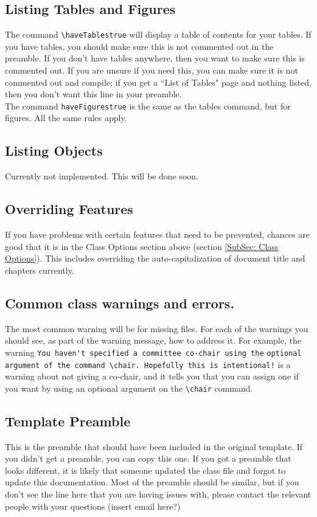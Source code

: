 \documentclass{article}
\begin{document}
    \subsection{Listing Tables and Figures}
        The command \verb|\haveTablestrue| will display a table of contents for your tables. If you have tables, you should make sure this is not commented out in the preamble. If you don't have tables anywhere, then you want to make sure this is commented out. If you are unsure if you need this, you can make sure it is not commented out and compile; if you get a ``List of Tables" page and nothing listed, then you don't want this line in your preamble.\\
        The command \verb|haveFigurestrue| is the same as the tables command, but for figures. All the same rules apply.
        
    \subsection{Listing Objects}
        Currently not implemented. This will be done soon.
    
    \subsection{Overriding Features}
        If you have problems with certain features that need to be prevented, chances are good that it is in the Class Options section above (section \ref{SubSec: Class Options}). This includes overriding the auto-capitalization of document title and chapters currently.
    
    \subsection{Common class warnings and errors.}
        The most common warning will be for missing files. For each of the warnings you should see, as part of the warning message, how to address it. For example, the warning \verb|You haven't specified a committee co-chair using the| \verb|optional argument of the command \chair. Hopefully this is intentional!| is a warning about not giving a co-chair, and it tells you that you can assign one if you want by using an optional argument on the \verb|\chair| command.
    
    \subsection{Template Preamble}\label{SubSec: Template Preamble}
        This is the preamble that should have been included in the original template. If you didn't get a preamble, you can copy this one. If you got a preamble that looks different, it is likely that someone updated the class file and forgot to update this documentation. Most of the preamble should be similar, but if you don't see the line here that you are having issues with, please contact the relevant people with your questions (insert email here?)
        
\end{document}
